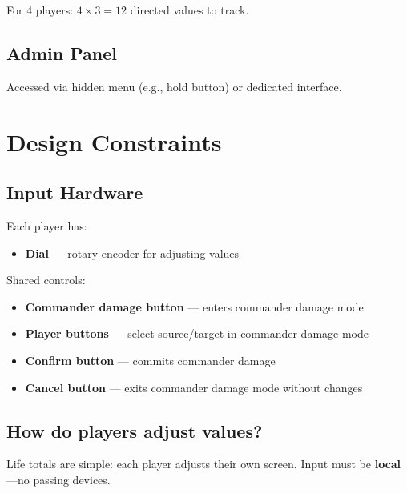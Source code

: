 \documentclass[11pt,a4paper]{article}
\begin{document}
For 4 players: $4 \times 3 = 12$ directed values to track.

\subsection{Admin Panel}

\begin{center}
\end{center}

Accessed via hidden menu (e.g., hold button) or dedicated interface.

\section{Design Constraints}

\subsection{Input Hardware}

Each player has:
\begin{itemize}
    \item \textbf{Dial} --- rotary encoder for adjusting values
\end{itemize}

\noindent Shared controls:
\begin{itemize}
    \item \textbf{Commander damage button} --- enters commander damage mode
    \item \textbf{Player buttons} --- select source/target in commander damage mode
    \item \textbf{Confirm button} --- commits commander damage
    \item \textbf{Cancel button} --- exits commander damage mode without changes
\end{itemize}

\subsection{How do players adjust values?}

Life totals are simple: each player adjusts their own screen. Input must be \textbf{local}---no passing devices.
\end{document}
